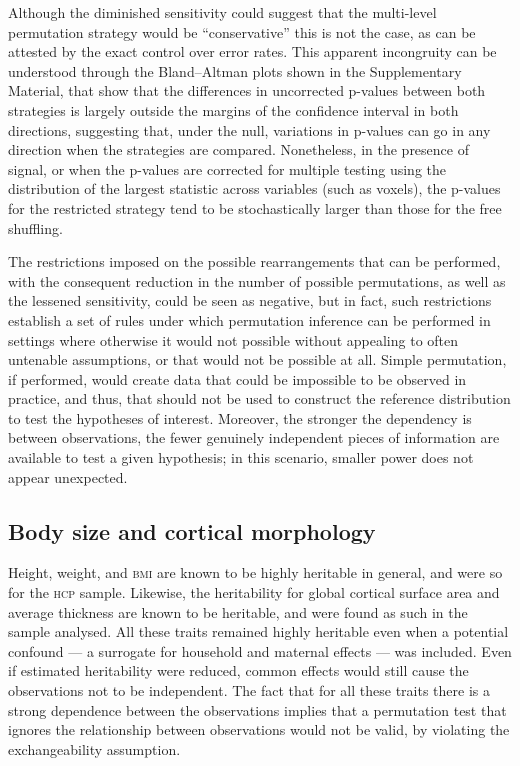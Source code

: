 Although the diminished sensitivity could suggest that the multi-level permutation strategy would be ``conservative'' this is not the case, as can be attested by the exact control over error rates. This apparent incongruity can be understood through the Bland--Altman plots shown in the Supplementary Material, that show that the differences in uncorrected p-values between both strategies is largely outside the margins of the confidence interval in both directions, suggesting that, under the null, variations in p-values can go in any direction when the strategies are compared. Nonetheless, in the presence of signal, or when the p-values are corrected for multiple testing using the distribution of the largest statistic across variables (such as voxels), the p-values for the restricted strategy tend to be stochastically larger than those for the free shuffling.

The restrictions imposed on the possible rearrangements that can be performed, with the consequent reduction in the number of possible permutations, as well as the lessened sensitivity, could be seen as negative, but in fact, such restrictions establish a set of rules under which permutation inference can be performed in settings where otherwise it would not possible without appealing to often untenable assumptions, or that would not be possible at all. Simple permutation, if performed, would create data that could be impossible to be observed in practice, and thus, that should not be used to construct the reference distribution to test the hypotheses of interest. Moreover, the stronger the dependency is between observations, the fewer genuinely independent pieces of information are available to test a given hypothesis; in this scenario, smaller power does not appear unexpected.

\subsection{Body size and cortical morphology}

Height, weight, and \textsc{bmi} are known to be highly heritable in general, and were so for the \textsc{hcp} sample. Likewise, the heritability for global cortical surface area and average thickness are known to be heritable, and were found as such in the sample analysed. All these traits remained highly heritable even when a potential confound --- a surrogate for household and maternal effects --- was included. Even if estimated heritability were reduced, common effects would still cause the observations not to be independent. The fact that for all these traits there is a strong dependence between the observations implies that a permutation test that ignores the relationship between observations would not be valid, by violating the exchangeability assumption.

